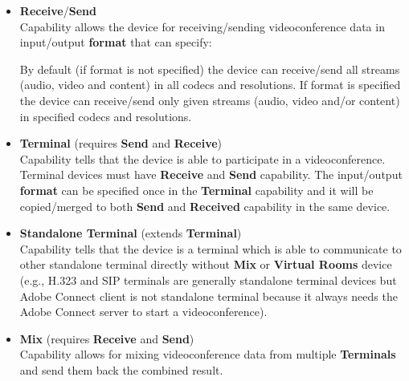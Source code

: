 \begin{itemize}
\newcommand{\RequireCapability}[1]{(requires #1)}
\newcommand{\ExtendCapability}[1]{(extends #1)}
  
\item \textbf{Receive}/\textbf{Send} \\
  Capability allows the device for receiving/sending videoconference data in
  input/output \textbf{format} that can specify:
  By default (if format is not specified) the device can receive/send all 
  streams (audio, video and content) in all codecs and resolutions.
  If format is specified the device can receive/send only
  given streams (audio, video and/or content) in specified 
  codecs and resolutions.
  
\item \textbf{Terminal} %
  \RequireCapability{\textbf{Send} and \textbf{Receive}} \\
  Capability tells that the device is able to participate in a 
  videoconference. Terminal devices must have \textbf{Receive} and 
  \textbf{Send} capability. The input/output \textbf{format} can be 
  specified once in the \textbf{Terminal} capability and it will be 
  copied/merged to both \textbf{Send} and \textbf{Received} capability in the 
  same device.
  
\item \textbf{Standalone Terminal} \ExtendCapability{\textbf{Terminal}} \\
  Capability tells that the device is a terminal which is able to communicate 
  to other standalone terminal directly without \textbf{Mix} or 
  \textbf{Virtual Rooms} device (e.g., H.323 and SIP terminals are generally 
  standalone terminal devices but Adobe Connect client is not standalone 
  terminal because it always needs the Adobe Connect server to start a 
  videoconference).
  
\item \textbf{Mix} \RequireCapability{\textbf{Receive} and \textbf{Send}} \\
  Capability allows for mixing videoconference data from multiple 
  \textbf{Terminals} and send them back the combined result.
  

\end{itemize}
